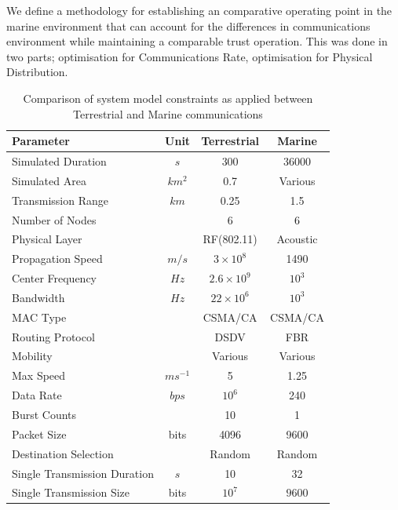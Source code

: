 \documentclass[runningheads,a4paper]{llncs}
\begin{document}
We define a methodology for establishing an comparative operating point in the marine environment that can account for the differences in communications environment while maintaining a comparable trust operation.
This was done in two parts; optimisation for Communications Rate, optimisation for Physical Distribution.

\begin{table}[h]
  \caption{Comparison of system model constraints as applied between Terrestrial and Marine communications} \label{tab:sysconstraints}
  \begin{center}
    \setlength{\tabcolsep}{8pt}
    \begin{tabular}{lccc}
      \toprule
      Parameter & Unit & Terrestrial & Marine \\
      \midrule
      Simulated Duration & $s$ & 300 & 36000\\
      Simulated Area & $km^2$ & 0.7 & Various \\
      Transmission Range & $km$ & 0.25 & 1.5 \\
      Number of Nodes & & 6 & 6 \\
      Physical Layer & & RF(802.11) & Acoustic\\
      Propagation Speed& $m/s$ & $3\times10^8$ & 1490\\
      Center Frequency& $Hz$ & $2.6\times10^9$ & $10^3$ \\
      Bandwidth& $Hz$ & $22\times10^6$ & $10^3$\\
      MAC Type & & CSMA/CA & CSMA/CA\\
      Routing Protocol & & DSDV & FBR \\
      Mobility & & Various & Various \\
      Max Speed & $ms^{-1}$ & 5 & 1.25 \\
      Data Rate & $bps$ & $10^6$ & 240 \\
      Burst Counts & & 10 & 1 \\
      Packet Size & bits & 4096 &  9600 \\
      Destination Selection & & Random & Random\\
      Single Transmission Duration & $s$ & 10 & 32 \\
      Single Transmission Size & bits & $10^7$ & $9600$ \\
      \bottomrule
    \end{tabular}
    \setlength{\tabcolsep}{6pt}
  \end{center}
\end{table}
\end{document}
